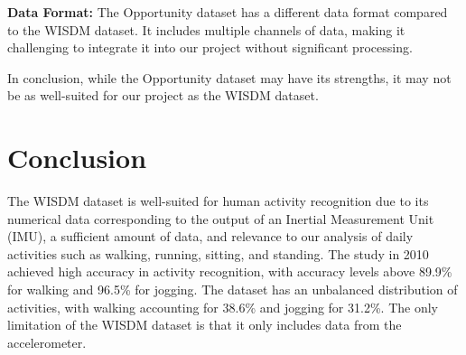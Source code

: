 \textbf{Data Format:}  The Opportunity dataset has a different data format compared to the WISDM dataset. It includes multiple channels of data, making it challenging to integrate it into our project without significant processing.

In conclusion, while the Opportunity dataset may have its strengths, it may not be as well-suited for our project as the WISDM dataset.

\section{Conclusion}
The WISDM dataset is well-suited for human activity recognition due to its numerical data corresponding to the output of an Inertial Measurement Unit (IMU), a sufficient amount of data, and relevance to our analysis of daily activities such as walking, running, sitting, and standing. The study in 2010 achieved high accuracy in activity recognition, with accuracy levels above 89.9\% for walking and 96.5\% for jogging. The dataset has an unbalanced distribution of activities, with walking accounting for 38.6\% and jogging for 31.2\%. The only limitation of the WISDM dataset is that it only includes data from the accelerometer.

